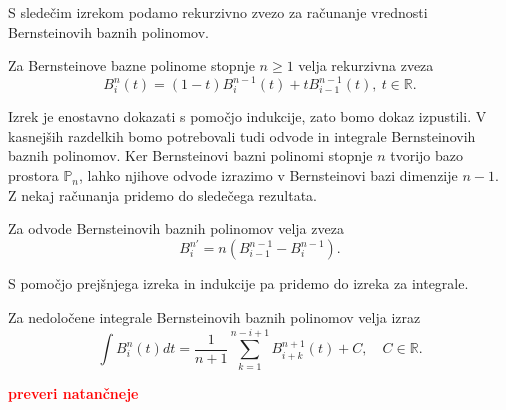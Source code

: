 \documentclass[isrm2, tisk]{fmfdelo}
\newcommand{\R}{\mathbb R}
\newcommand{\mycomment}[1]{\textbf{\textcolor{red}{#1}}}
\begin{document}
    S sledečim izrekom podamo rekurzivno zvezo za računanje vrednosti Bernsteinovih baznih polinomov.
    \begin{izrek}
        \label{izrek:bernsteinovi_lastnosti:rekruzija}
        Za Bernsteinove bazne polinome stopnje $n\geq1$ velja rekurzivna zveza
        \[B_i^n(t) = (1-t)B_i^{n-1}(t) + tB_{i-1}^{n-1}(t),\ t\in\R.\]
    \end{izrek}
    \noindent Izrek je enostavno dokazati s pomočjo indukcije, zato bomo dokaz izpustili.
    V kasnejših razdelkih bomo potrebovali tudi odvode in integrale Bernsteinovih baznih polinomov.
    Ker Bernsteinovi bazni polinomi stopnje $n$ tvorijo bazo prostora $\mathbb{P}_n$, lahko njihove odvode izrazimo v Bernsteinovi bazi dimenzije $n-1$.
    Z nekaj računanja pridemo do sledečega rezultata.
    \begin{izrek}
        \label{izrek:bernstein-odvod}
        Za odvode Bernsteinovih baznih polinomov velja zveza
        \[B_{i}^{n\prime}=n(B_{i-1}^{n-1} - B_{i}^{n-1}).\]
    \end{izrek}
    \noindent S pomočjo prejšnjega izreka in indukcije pa pridemo do izreka za integrale.
    \begin{izrek}
        \label{izrek:bernstein-integral}
        Za nedoločene integrale Bernsteinovih baznih polinomov velja izraz
        \[\int B_{i}^{n}(t)dt= \frac{1}{n+1} \sum_{k=1}^{n-i+1}  B_{i+k}^{n+1}(t) + C,\quad C\in\R. \]
    \end{izrek}
    \mycomment{preveri natančneje}
\end{document}
